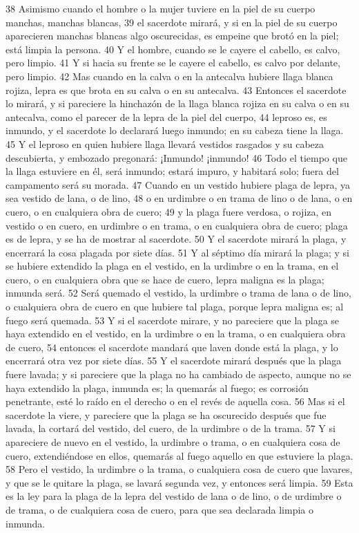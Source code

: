 38 Asimismo cuando el hombre o la mujer tuviere en la piel de su cuerpo manchas, manchas blancas,
39 el sacerdote mirará, y si en la piel de su cuerpo aparecieren manchas blancas algo oscurecidas, es empeine que brotó en la piel; está limpia la persona.
40 Y el hombre, cuando se le cayere el cabello, es calvo, pero limpio.
41 Y si hacia su frente se le cayere el cabello, es calvo por delante, pero limpio.
42 Mas cuando en la calva o en la antecalva hubiere llaga blanca rojiza, lepra es que brota en su calva o en su antecalva.
43 Entonces el sacerdote lo mirará, y si pareciere la hinchazón de la llaga blanca rojiza en su calva o en su antecalva, como el parecer de la lepra de la piel del cuerpo,
44 leproso es, es inmundo, y el sacerdote lo declarará luego inmundo; en su cabeza tiene la llaga.
45 Y el leproso en quien hubiere llaga llevará vestidos rasgados y su cabeza descubierta, y embozado pregonará: ¡Inmundo! ¡inmundo!
46 Todo el tiempo que la llaga estuviere en él, será inmundo; estará impuro, y habitará solo; fuera del campamento será su morada.
47 Cuando en un vestido hubiere plaga de lepra, ya sea vestido de lana, o de lino,
48 o en urdimbre o en trama de lino o de lana, o en cuero, o en cualquiera obra de cuero;
49 y la plaga fuere verdosa, o rojiza, en vestido o en cuero, en urdimbre o en trama, o en cualquiera obra de cuero; plaga es de lepra, y se ha de mostrar al sacerdote.
50 Y el sacerdote mirará la plaga, y encerrará la cosa plagada por siete días.
51 Y al séptimo día mirará la plaga; y si se hubiere extendido la plaga en el vestido, en la urdimbre o en la trama, en el cuero, o en cualquiera obra que se hace de cuero, lepra maligna es la plaga; inmunda será.
52 Será quemado el vestido, la urdimbre o trama de lana o de lino, o cualquiera obra de cuero en que hubiere tal plaga, porque lepra maligna es; al fuego será quemada.
53 Y si el sacerdote mirare, y no pareciere que la plaga se haya extendido en el vestido, en la urdimbre o en la trama, o en cualquiera obra de cuero,
54 entonces el sacerdote mandará que laven donde está la plaga, y lo encerrará otra vez por siete días.
55 Y el sacerdote mirará después que la plaga fuere lavada; y si pareciere que la plaga no ha cambiado de aspecto, aunque no se haya extendido la plaga, inmunda es; la quemarás al fuego; es corrosión penetrante, esté lo raído en el derecho o en el revés de aquella cosa.
56 Mas si el sacerdote la viere, y pareciere que la plaga se ha oscurecido después que fue lavada, la cortará del vestido, del cuero, de la urdimbre o de la trama.
57 Y si apareciere de nuevo en el vestido, la urdimbre o trama, o en cualquiera cosa de cuero, extendiéndose en ellos, quemarás al fuego aquello en que estuviere la plaga.
58 Pero el vestido, la urdimbre o la trama, o cualquiera cosa de cuero que lavares, y que se le quitare la plaga, se lavará segunda vez, y entonces será limpia.
59 Esta es la ley para la plaga de la lepra del vestido de lana o de lino, o de urdimbre o de trama, o de cualquiera cosa de cuero, para que sea declarada limpia o inmunda.  


